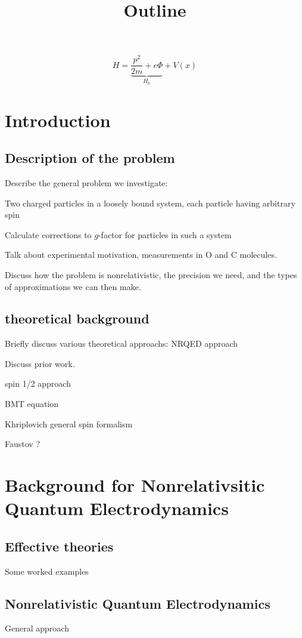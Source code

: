 \documentclass[12pt]{article}
\title{ Outline}
\author{}
\begin{document}
\maketitle


\[
	H = \underbrace{\frac{p^2}{2m} + e\Phi }_{H_0} + V(x) 
\]

\section{Introduction}
\subsection{ Description of the problem}
Describe the general problem we investigate: 

	Two charged particles in a loosely bound system, each particle having arbitrary spin

	Calculate corrections to $g$-factor for particles in such a system

Talk about experimental motivation, measurements in O and C molecules.

Discuss how the problem is nonrelativistic, the precision we need, and the types of approximations we can then make.

\subsection{theoretical background}
Briefly discuss various theoretical approachs:
NRQED approach

Discuss prior work.

spin 1/2 approach

BMT equation

Khriplovich general spin formalism

Faustov ?


\section{Background for Nonrelativsitic Quantum Electrodynamics}
\subsection{Effective theories}
Some worked examples
\subsection{Nonrelativistic Quantum Electrodynamics}
General approach
\end{document}
